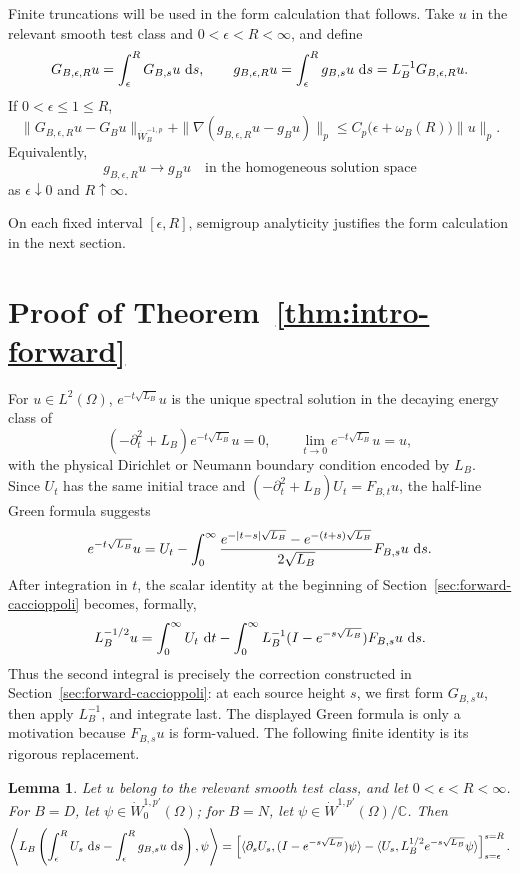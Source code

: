 \documentclass[12pt]{amsart}
\newcommand\dd{\,{\rm d}}
\newtheorem{lemma}[theorem]{Lemma}
\theoremstyle{remark}
\begin{document}
Finite truncations will be used in the form calculation that follows.
Take \(u\) in the relevant smooth test class and
\(0<\epsilon<R<\infty\), and define
\begin{equation}\label{eq:truncated-form-error}
 G_{B,\epsilon,R}u=\int_\epsilon^R G_{B,s}u\,\dd s,
 \qquad
 g_{B,\epsilon,R}u=\int_\epsilon^R g_{B,s}u\,\dd s
                  =L_B^{-1}G_{B,\epsilon,R}u.
\end{equation}
If
\(0<\epsilon\leq1\leq R\),
\[
 \|G_{B,\epsilon,R}u-G_Bu\|_{\dot W^{-1,p}_B}
 +\|\nabla(g_{B,\epsilon,R}u-g_Bu)\|_p
 \leq C_p\bigl(\epsilon+\omega_B(R)\bigr)\|u\|_p.
\]
Equivalently,
\begin{equation}\label{eq:truncated-correction-limit}
 g_{B,\epsilon,R}u\longrightarrow g_Bu
 \quad\text{in the homogeneous solution space}
\end{equation}
as \(\epsilon\downarrow0\) and \(R\uparrow\infty\).

On each fixed interval \([\epsilon,R]\), semigroup analyticity justifies
the form calculation in the next section.

\section{Proof of Theorem~\ref{thm:intro-forward}}
\label{sec:proof-forward}

For \(u\in L^2(\Omega)\), \(e^{-t\sqrt{L_B}}u\) is the unique spectral solution in the decaying energy class of
\[
 (-\partial_t^2+L_B) e^{-t\sqrt{L_B}} u=0,
 \qquad \lim_{t\to0}e^{-t\sqrt{L_B}} u=u,
\]
with the physical Dirichlet or Neumann boundary condition encoded by
\(L_B\).  Since \(U_t\) has the same initial trace and
\((-\partial_t^2+L_B)U_t=F_{B,t}u\), the half-line Green formula suggests
\[
 e^{-t\sqrt{L_B}} u=U_t-\int_0^\infty
 \frac{e^{-|t-s|\sqrt{L_B}}-e^{-(t+s)\sqrt{L_B}}}
      {2\sqrt{L_B}}F_{B,s}u\,\dd s.
\]
After integration in \(t\), the scalar identity at the beginning of
Section~\ref{sec:forward-caccioppoli} becomes, formally,
\[
 L_B^{-1/2}u
 =\int_0^\infty U_t\,\dd t
  -\int_0^\infty L_B^{-1}(I-e^{-s\sqrt{L_B}})F_{B,s}u\,\dd s.
\]
Thus the second integral is precisely the correction constructed in
Section~\ref{sec:forward-caccioppoli}: at each source height \(s\), we
first form \(G_{B,s}u\), then apply \(L_B^{-1}\), and integrate last.
The displayed Green formula is only a motivation because
\(F_{B,s}u\) is form-valued.  The following finite identity is its
rigorous replacement.

\begin{lemma}
\label{lem:finite-cylinder-identity}
Let \(u\) belong to the relevant smooth test class, and let
\(0<\epsilon<R<\infty\).  For \(B=D\), let
\(\psi\in\dot W^{1,p'}_0(\Omega)\); for \(B=N\), let
\(\psi\in\dot W^{1,p'}(\Omega)/\mathbb C\).  Then
\begin{align}
 \left\langle L_B\left(\int_\epsilon^R U_s\,\dd s
              -\int_\epsilon^R g_{B,s}u\,\dd s\right),\psi\right\rangle
 =\left[
   \langle\partial_sU_s,(I-e^{-s\sqrt{L_B}})\psi\rangle
   -\langle U_s,L_B^{1/2}e^{-s\sqrt{L_B}}\psi\rangle
   \right]_{s=\epsilon}^{s=R}.
 \label{eq:finite-cylinder-identity}
\end{align}
\end{lemma}
\end{document}
